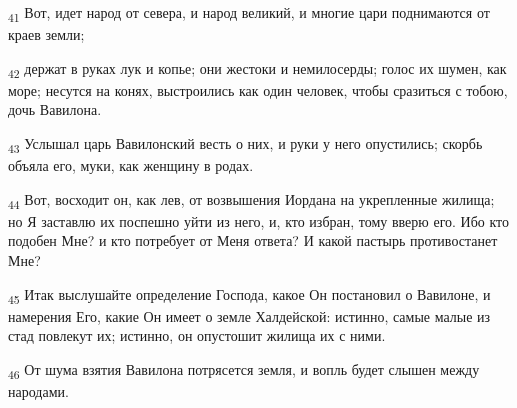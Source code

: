 \begin{tcolorbox}
\textsubscript{41} Вот, идет народ от севера, и народ великий, и многие цари поднимаются от краев земли;
\end{tcolorbox}
\begin{tcolorbox}
\textsubscript{42} держат в руках лук и копье; они жестоки и немилосерды; голос их шумен, как море; несутся на конях, выстроились как один человек, чтобы сразиться с тобою, дочь Вавилона.
\end{tcolorbox}
\begin{tcolorbox}
\textsubscript{43} Услышал царь Вавилонский весть о них, и руки у него опустились; скорбь объяла его, муки, как женщину в родах.
\end{tcolorbox}
\begin{tcolorbox}
\textsubscript{44} Вот, восходит он, как лев, от возвышения Иордана на укрепленные жилища; но Я заставлю их поспешно уйти из него, и, кто избран, тому вверю его. Ибо кто подобен Мне? и кто потребует от Меня ответа? И какой пастырь противостанет Мне?
\end{tcolorbox}
\begin{tcolorbox}
\textsubscript{45} Итак выслушайте определение Господа, какое Он постановил о Вавилоне, и намерения Его, какие Он имеет о земле Халдейской: истинно, самые малые из стад повлекут их; истинно, он опустошит жилища их с ними.
\end{tcolorbox}
\begin{tcolorbox}
\textsubscript{46} От шума взятия Вавилона потрясется земля, и вопль будет слышен между народами.
\end{tcolorbox}
